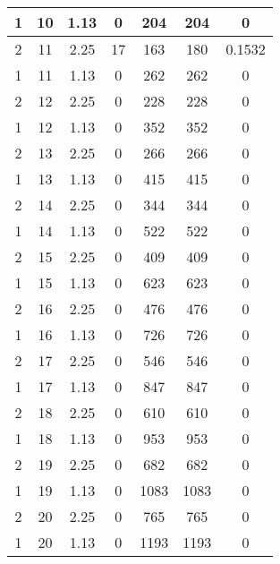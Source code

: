\documentclass[letterpaper, 12pt]{article}
\begin{document}
\begin{longtable}{|c|c|c|c|c|c|c|}
\hline
1 & 10 & 1.13 & 0 & 204 & 204 & 0 \\
\hline
2 & 11 & 2.25 & 17 & 163 & 180 & 0.1532 \\
\hline
1 & 11 & 1.13 & 0 & 262 & 262 & 0 \\
\hline
2 & 12 & 2.25 & 0 & 228 & 228 & 0 \\
\hline
1 & 12 & 1.13 & 0 & 352 & 352 & 0 \\
\hline
2 & 13 & 2.25 & 0 & 266 & 266 & 0 \\
\hline
1 & 13 & 1.13 & 0 & 415 & 415 & 0 \\
\hline
2 & 14 & 2.25 & 0 & 344 & 344 & 0 \\
\hline
1 & 14 & 1.13 & 0 & 522 & 522 & 0 \\
\hline
2 & 15 & 2.25 & 0 & 409 & 409 & 0 \\
\hline
1 & 15 & 1.13 & 0 & 623 & 623 & 0 \\
\hline
2 & 16 & 2.25 & 0 & 476 & 476 & 0 \\
\hline
1 & 16 & 1.13 & 0 & 726 & 726 & 0 \\
\hline
2 & 17 & 2.25 & 0 & 546 & 546 & 0 \\
\hline
1 & 17 & 1.13 & 0 & 847 & 847 & 0 \\
\hline
2 & 18 & 2.25 & 0 & 610 & 610 & 0 \\
\hline
1 & 18 & 1.13 & 0 & 953 & 953 & 0 \\
\hline
2 & 19 & 2.25 & 0 & 682 & 682 & 0 \\
\hline
1 & 19 & 1.13 & 0 & 1083 & 1083 & 0 \\
\hline
2 & 20 & 2.25 & 0 & 765 & 765 & 0 \\
\hline
1 & 20 & 1.13 & 0 & 1193 & 1193 & 0 \\
\hline
\end{longtable}
\end{document}
